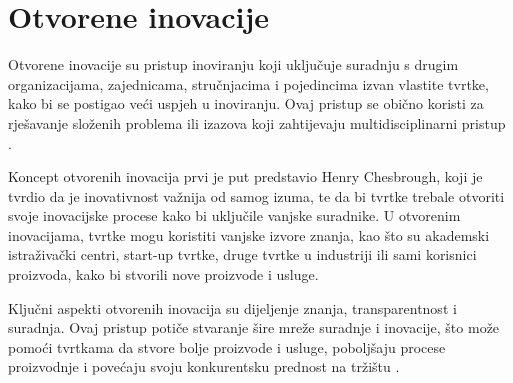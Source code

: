 \chapter{Otvorene inovacije}

Otvorene inovacije su pristup inoviranju koji uključuje suradnju s drugim
organizacijama, zajednicama, stručnjacima i pojedincima izvan vlastite tvrtke,
kako bi se postigao veći uspjeh u inoviranju. Ovaj pristup se obično koristi za
rješavanje složenih problema ili izazova koji zahtijevaju multidisciplinarni
pristup \citep{openinnovation2023,openinnovation2003}.

Koncept otvorenih inovacija prvi je put predstavio Henry Chesbrough, koji je
tvrdio da je inovativnost važnija od samog izuma, te da bi tvrtke trebale
otvoriti svoje inovacijske procese kako bi uključile vanjske suradnike. U
otvorenim inovacijama, tvrtke mogu koristiti vanjske izvore znanja, kao što su
akademski istraživački centri, start-up tvrtke, druge tvrtke u industriji ili
sami korisnici proizvoda, kako bi stvorili nove proizvode i usluge.

Ključni aspekti otvorenih inovacija su dijeljenje znanja, transparentnost i
suradnja. Ovaj pristup potiče stvaranje šire mreže suradnje i inovacije, što
može pomoći tvrtkama da stvore bolje proizvode i usluge, poboljšaju procese
proizvodnje i povećaju svoju konkurentsku prednost na tržištu
\citep{openinnovation2023,openinnovation2003}.